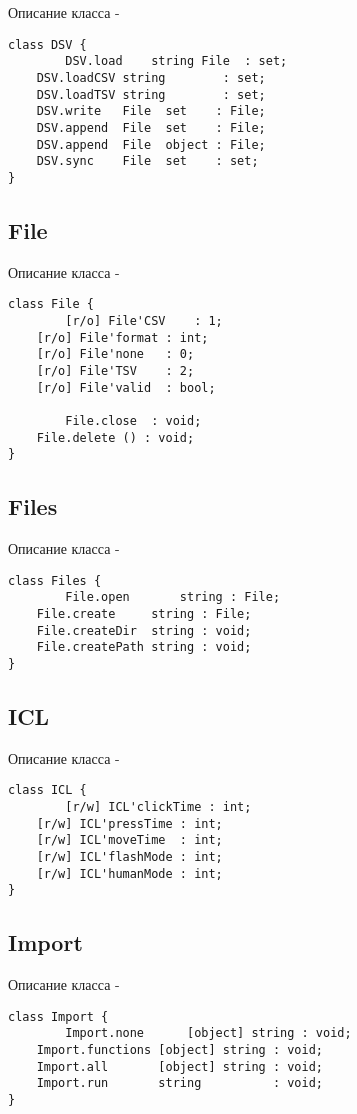 \noindent Описание класса  -
\begin{lstlisting}[numbers=none]
class DSV {
        DSV.load    string File  : set;
	DSV.loadCSV string        : set;
	DSV.loadTSV string        : set;
	DSV.write   File  set    : File;
	DSV.append  File  set    : File;
	DSV.append  File  object : File;
	DSV.sync    File  set    : set;
}
\end{lstlisting}

\subsection{{\color{orange} File}}

\noindent Описание класса  -
\begin{lstlisting}[numbers=none]
class File {
        [r/o] File'CSV    : 1;
	[r/o] File'format : int;
	[r/o] File'none   : 0;
	[r/o] File'TSV    : 2;
	[r/o] File'valid  : bool;
	
        File.close  : void;
	File.delete () : void;
}
\end{lstlisting}

\subsection{{\color{orange} Files}}

\noindent Описание класса  -
\begin{lstlisting}[numbers=none]
class Files {
        File.open       string : File;
	File.create     string : File;
	File.createDir  string : void;
	File.createPath string : void;
}
\end{lstlisting}

\subsection{{\color{orange} ICL}}

\noindent Описание класса  -
\begin{lstlisting}[numbers=none]
class ICL {
        [r/w] ICL'clickTime : int;
	[r/w] ICL'pressTime : int;
	[r/w] ICL'moveTime  : int;
	[r/w] ICL'flashMode : int;
	[r/w] ICL'humanMode : int;
}
\end{lstlisting}

\subsection{{\color{orange} Import}}

\noindent Описание класса  -
\begin{lstlisting}[numbers=none]
class Import {
        Import.none      [object] string : void;
	Import.functions [object] string : void;
	Import.all       [object] string : void;
	Import.run       string          : void;
}
\end{lstlisting}


